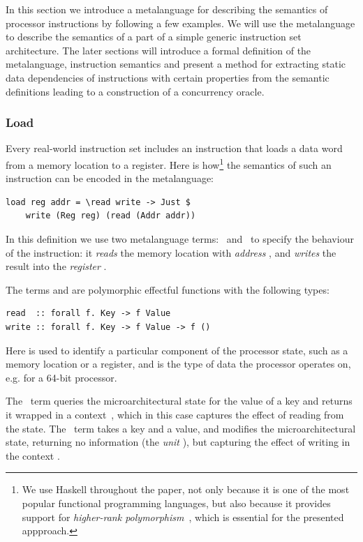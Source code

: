 In this section we introduce a metalanguage for describing the semantics of
processor instructions by following a few examples. We will use the metalanguage
to describe the semantics of a part of a simple generic instruction set
architecture. The later sections will introduce a formal definition of the
metalanguage, instruction semantics and present a method for
extracting static data dependencies of instructions with certain properties from
the semantic definitions leading to a construction of a concurrency oracle.

\subsubsection{Load} Every real-world instruction set includes an instruction
that loads a data word from a memory location to a register. Here is
how\footnote{We use Haskell throughout the paper, not only because it is one of
the most popular functional programming languages, but also because it provides
support for \emph{higher-rank polymorphism}~\cite{jones2007practical}, which is
essential for the presented appproach.} the semantics of such an instruction can
be encoded in the metalanguage:

\begin{verbatim}
load reg addr = \read write -> Just $
    write (Reg reg) (read (Addr addr))
\end{verbatim}

\noindent
In this definition we use two metalanguage terms:~ and~ to
specify the behaviour of the instruction: it \emph{reads} the memory location
with \emph{address} , and \emph{writes} the result into the
\emph{register} .

The terms  and  are polymorphic effectful functions with the
following types:

\begin{verbatim}
read  :: forall f. Key -> f Value
write :: forall f. Key -> f Value -> f ()
\end{verbatim}

\noindent
Here  is used to identify a particular component of the processor state,
such as a memory location or a register, and  is the type of data the
processor operates on, e.g.  for a 64-bit processor.

The~ term queries the microarchitectural state for the value of a key
and returns it wrapped in a context~, which in this case captures the
effect of reading from the state. The~ term takes a key and a value,
and modifies the microarchitectural state, returning no information (the
\emph{unit} \hs{()}), but capturing the effect of writing in the context .

